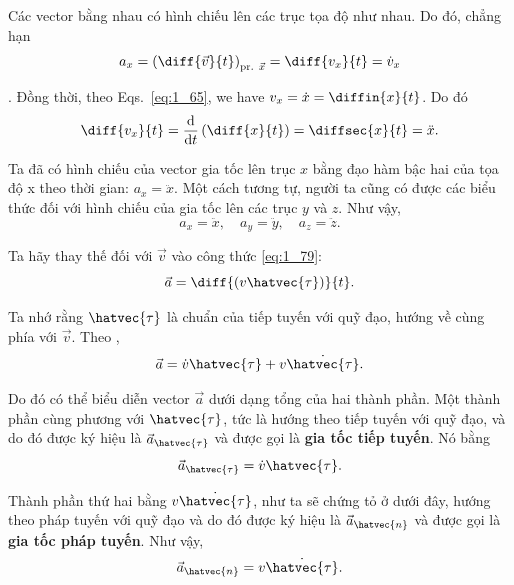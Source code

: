 Các vector bằng nhau có hình chiếu lên các trục tọa độ như nhau. Do đó, chẳng hạn
\begin{equation*}
a_x = \left(\diff{\vec{v}}{t}\right)_{\text{pr. }\vec{x}} = \diff{v_x}{t} = \dot{v}_x
\end{equation*}

. Đồng thời, theo Eqs.~\eqref{eq:1_65}, we have $v_x=\dot{x}=\diffin{x}{t}$. Do đó
\begin{equation*}
\diff{v_x}{t} = \frac{\mathrm{d}}{\mathrm{d}t} \left(\diff{x}{t}\right) = \diffsec{x}{t} = \ddot{x}.
\end{equation*}

\noindent
Ta đã có hình chiếu của vector gia tốc lên trục $x$ bằng đạo hàm bậc hai của tọa độ x theo thời gian: $a_x=\ddot{x}$. Một cách tương tự, người ta cũng có được các biểu thức đối với hình chiếu của gia tốc lên các trục $y$ và $z$. Như vậy,
\begin{equation}\label{eq:1_80}
a_x=\ddot{x},\quad a_y=\ddot{y},\quad a_z=\ddot{z}.
\end{equation}

Ta hãy thay thế  đối với $\vec{v}$  vào công thức \eqref{eq:1_79}:
\begin{equation}\label{eq:1_81}
\vec{a} = \diff{(v\hatvec{\tau})}{t}.
\end{equation}

\noindent
Ta nhớ rằng $\hatvec{\tau}$ là chuẩn của tiếp tuyến với quỹ đạo, hướng về cùng phía với $\vec{v}$. Theo ,
\begin{equation}\label{eq:1_82}
\vec{a} = \dot{v}\hatvec{\tau} + v\dot{\hatvec{\tau}}.
\end{equation}

\noindent
Do đó có thể biểu diễn vector $\vec{a}$ dưới dạng tổng của hai thành phần. Một thành phần cùng phương với $\hatvec{\tau}$, tức là hướng theo tiếp tuyến với quỹ đạo, và do đó được ký hiệu là $\vec{a}_{\hatvec{\tau}}$ và được gọi là \textbf{gia tốc tiếp tuyến}. Nó bằng
\begin{equation}\label{eq:1_83}
\vec{a}_{\hatvec{\tau}} = \dot{v}\hatvec{\tau}.
\end{equation}

\noindent
Thành phần thứ hai bằng $v\dot{\hatvec{\tau}}$, như ta sẽ chứng tỏ ở dưới đây, hướng theo pháp tuyến với quỹ đạo và do đó được ký hiệu là $\vec{a}_{\hatvec{n}}$ và được gọi là \textbf{gia tốc pháp tuyến}. Như vậy,
\begin{equation}\label{eq:1_84}
\vec{a}_{\hatvec{n}} = v\dot{\hatvec{\tau}}.
\end{equation}

